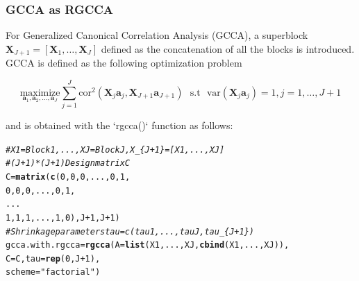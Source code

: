 \documentclass[10pt,xcolor=dvipsnames]{beamer}\usepackage[]{graphicx}\usepackage[]{color}
\makeatletter
\newcommand{\hlstr}[1]{\textcolor[rgb]{0.192,0.494,0.8}{#1}}%
\newcommand{\hlcom}[1]{\textcolor[rgb]{0.678,0.584,0.686}{\textit{#1}}}%
\newcommand{\hlkwd}[1]{\textcolor[rgb]{0.737,0.353,0.396}{\textbf{#1}}}%
\newenvironment{kframe}{%
 \def\at@end@of@kframe{}%
 \ifinner\ifhmode%
  \def\at@end@of@kframe{\end{minipage}}%
  \begin{minipage}{\columnwidth}%
 \fi\fi%
 \def\FrameCommand##1{\hskip\@totalleftmargin \hskip-\fboxsep
 \colorbox{shadecolor}{##1}\hskip-\fboxsep
     \hskip-\linewidth \hskip-\@totalleftmargin \hskip\columnwidth}%
 \MakeFramed {\advance\hsize-\width
   \@totalleftmargin\z@ \linewidth\hsize
   \@setminipage}}%
 {\par\unskip\endMakeFramed%
 \at@end@of@kframe}
\newenvironment{knitrout}{}{} %
\newcommand{\X}{\mathbf{X}}
\newcommand{\ma}[1]{\ensuremath{\mathbf{#1}}}
\makeatother
\begin{document}
\begin{frame}\frametitle{GCCA as RGCCA}

For Generalized Canonical Correlation Analysis (GCCA), a superblock $\ma X_{J+1} = \left[\ma X_1, \dots, \ma X_J \right]$ defined as the concatenation of all the blocks is introduced. GCCA is defined as the following optimization problem 

\begin{equation*}
\underset{\ma a_1, \ma a_2, \ldots,\ma a_J} {\text{maximize}} \displaystyle \sum_{j=1}^J \text{cor}^2(\ma X_j\ma a_j, \ma X_{J+1}\ma a_{J+1}) \text{~~s.t~~} \text{var}(\X_j \ma a_j) = 1, j=1, \ldots, J+1
\end{equation*}

and is obtained with the `rgcca()` function as follows:
\begin{knitrout}\footnotesize
{}\color{fgcolor}\begin{kframe}
\begin{alltt}
\hlcom{# X1 = Block1, ..., XJ = BlockJ, X_\{J+1\} = [X1, ..., XJ]}
\hlcom{# (J+1)*(J+1) Design matrix C}
C = \hlkwd{matrix}(\hlkwd{c}(0, 0, 0, ..., 0, 1,
             0, 0, 0, ..., 0, 1,
                    ...
             1, 1, 1, ..., 1, 0), J+1, J+1)
\hlcom{# Shrinkage parameters tau = c(tau1, ...,  tauJ, tau_\{J+1\})}
gcca.with.rgcca = \hlkwd{rgcca}(A= \hlkwd{list}(X1, ..., XJ, \hlkwd{cbind}(X1, ..., XJ)), 
                       C = C, tau = \hlkwd{rep}(0, J+1),
                       scheme = \hlstr{"factorial"})
\end{alltt}
\end{kframe}
\end{knitrout}
\end{frame}
\end{document}
